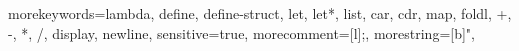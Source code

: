 	{morekeywords={lambda,
                   define, define-struct, let, let*,
                   list, car, cdr, map, foldl,
                   +, -, *, /,
                   display, newline},
     sensitive=true,
     morecomment=[l]{;},
     morestring=[b]{"},}

\lstset{language=Racket,
        basicstyle=\ttfamily\small,
        keywordstyle=\bf,
        emphstyle=\underbar,
        showstringspaces=false,
        numbers=left,
        numberstyle=\tiny,
        numbersep=-30pt}

